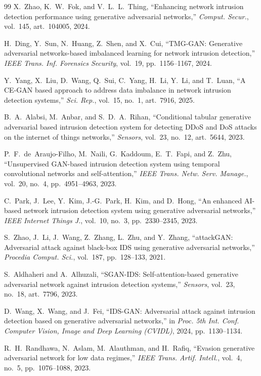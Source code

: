 \documentclass[11pt,a4paper]{article}
\begin{document}
\begin{thebibliography}{99}
 X.~Zhao, K.~W.~Fok, and V.~L.~L.~Thing, ``Enhancing network
intrusion detection performance using generative adversarial networks,''
\emph{Comput. Secur.}, vol.~145, art.~104005, 2024.

 H.~Ding, Y.~Sun, N.~Huang, Z.~Shen, and X.~Cui, ``TMG-GAN:
Generative adversarial networks-based imbalanced learning for network intrusion
detection,'' \emph{IEEE Trans. Inf. Forensics Security}, vol.~19, pp.~1156--1167,
2024.

 Y.~Yang, X.~Liu, D.~Wang, Q.~Sui, C.~Yang, H.~Li, Y.~Li, and
T.~Luan, ``A CE-GAN based approach to address data imbalance in network
intrusion detection systems,'' \emph{Sci. Rep.}, vol.~15, no.~1, art.~7916,
2025.

 B.~A.~Alabsi, M.~Anbar, and S.~D.~A.~Rihan, ``Conditional
tabular generative adversarial based intrusion detection system for detecting
DDoS and DoS attacks on the internet of things networks,'' \emph{Sensors},
vol.~23, no.~12, art.~5644, 2023.

 P.~F.~de~Araujo-Filho, M.~Naili, G.~Kaddoum, E.~T.~Fapi, and
Z.~Zhu, ``Unsupervised GAN-based intrusion detection system using temporal
convolutional networks and self-attention,'' \emph{IEEE Trans. Netw. Serv.
Manage.}, vol.~20, no.~4, pp.~4951--4963, 2023.

 C.~Park, J.~Lee, Y.~Kim, J.-G.~Park, H.~Kim, and D.~Hong, ``An
enhanced AI-based network intrusion detection system using generative
adversarial networks,'' \emph{IEEE Internet Things J.}, vol.~10, no.~3,
pp.~2330--2345, 2023.

 S.~Zhao, J.~Li, J.~Wang, Z.~Zhang, L.~Zhu, and Y.~Zhang,
``attackGAN: Adversarial attack against black-box IDS using generative
adversarial networks,'' \emph{Procedia Comput. Sci.}, vol.~187, pp.~128--133,
2021.

 S.~Aldhaheri and A.~Alhuzali, ``SGAN-IDS: Self-attention-based
generative adversarial network against intrusion detection systems,''
\emph{Sensors}, vol.~23, no.~18, art.~7796, 2023.

 D.~Wang, X.~Wang, and J.~Fei, ``IDS-GAN: Adversarial attack
against intrusion detection based on generative adversarial networks,'' in
\emph{Proc. 5th Int. Conf. Computer Vision, Image and Deep Learning (CVIDL)},
2024, pp.~1130--1134.

 R.~H.~Randhawa, N.~Aslam, M.~Alauthman, and H.~Rafiq,
``Evasion generative adversarial network for low data regimes,'' \emph{IEEE
Trans. Artif. Intell.}, vol.~4, no.~5, pp.~1076--1088, 2023.


\end{thebibliography}
\end{document}
